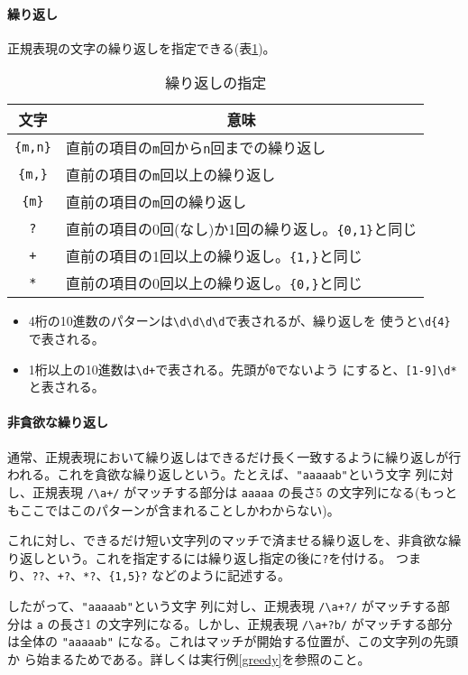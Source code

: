 \paragraph{繰り返し}
正規表現の文字の繰り返しを指定できる(表\ref{repeat})。
\begin{table}[ht]
\caption{繰り返しの指定}\label{repeat}
\begin{center}
 \begin{tabular}{|c|l|}\hline
  文字&\multicolumn{1}{c|}{意味}\\\hline
\verb+{m,n}+&直前の項目の\texttt{m}回から\texttt{n}回までの繰り返し\\\hline
\verb+{m,}+&直前の項目の\texttt{m}回以上の繰り返し\\\hline
\verb+{m}+&直前の項目の\texttt{m}回の繰り返し\\\hline
\verb+?+&直前の項目の0回(なし)か1回の繰り返し。\verb+{0,1}+と同じ\\\hline
\verb-+-&直前の項目の1回以上の繰り返し。\verb+{1,}+と同じ\\\hline
\verb+*+&直前の項目の0回以上の繰り返し。\verb+{0,}+と同じ\\\hline
\end{tabular}
\end{center}
\end{table}
\begin{itemize}
 \item 4桁の10進数のパターンは\verb+\d\d\d\d+で表されるが、繰り返しを
       使うと\verb+\d{4}+で表される。
 \item 1桁以上の10進数は\verb-\d+-で表される。先頭が\texttt{0}でないよう
       にすると、\verb+[1-9]\d*+と表される。
\end{itemize}
\paragraph{非貪欲な繰り返し}
通常、正規表現において繰り返しはできるだけ長く一致するように繰り返しが行
われる。これを貪欲な繰り返しという。たとえば、\verb+"aaaaab"+という文字
列に対し、正規表現 \verb-/\a+/- がマッチする部分は \verb+aaaaa+ の長さ5
の文字列になる(もっともここではこのパターンが含まれることしかわからない)。

これに対し、できるだけ短い文字列のマッチで済ませる繰り返しを、非貪欲な繰
り返しという。これを指定するには繰り返し指定の後に\verb+?+を付ける。
つまり、\verb-??-、\verb-+?-、\verb-*?-、\verb-{1,5}?- などのように記述する。

したがって、\verb+"aaaaab"+という文字
列に対し、正規表現 \verb-/\a+?/- がマッチする部分は \verb+a+ の長さ1
の文字列になる。しかし、正規表現 \verb-/\a+?b/- がマッチする部分は全体の
\verb+"aaaaab"+ になる。これはマッチが開始する位置が、この文字列の先頭か
ら始まるためである。詳しくは実行例\ref{greedy}を参照のこと。

